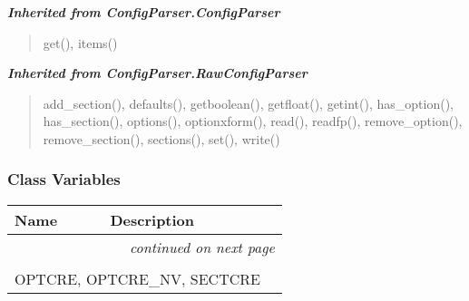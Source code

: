 \large{\textbf{\textit{Inherited from ConfigParser.ConfigParser}}}

\begin{quote}
get(), items()
\end{quote}

\large{\textbf{\textit{Inherited from ConfigParser.RawConfigParser}}}

\begin{quote}
add\_section(), defaults(), getboolean(), getfloat(), getint(), has\_option(), has\_section(), options(), optionxform(), read(), readfp(), remove\_option(), remove\_section(), sections(), set(), write()
\end{quote}


  \subsubsection{Class Variables}

    \vspace{-1cm}
\hspace{\varindent}\begin{longtable}{|p{\varnamewidth}|p{\vardescrwidth}|l}
\cline{1-2}
\cline{1-2} \centering \textbf{Name} & \centering \textbf{Description}& \\
\cline{1-2}
\endhead\cline{1-2}\multicolumn{3}{r}{\small\textit{continued on next page}}\\\endfoot\cline{1-2}
\endlastfoot\multicolumn{2}{|l|}{\textit{Inherited from ConfigParser.RawConfigParser}}\\
\multicolumn{2}{|p{\varwidth}|}{\raggedright OPTCRE, OPTCRE\_NV, SECTCRE}\\
\cline{1-2}
\end{longtable}

